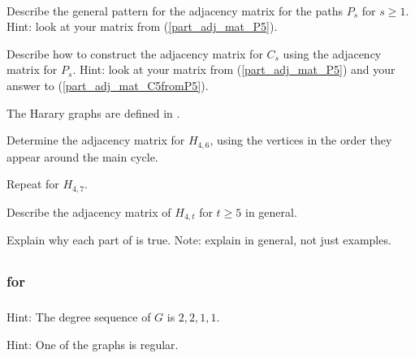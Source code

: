 \begin{exer}[\exerE] %
\label{exer_adj_mat_path_cycle} 
~
    \begin{exerpart}
        \item Describe the general pattern for the adjacency matrix for the paths $P_s$ for $s \ge 1$.  Hint: look at your matrix from  (\ref{part_adj_mat_P5}).
        \item Describe how to construct the adjacency matrix for $C_s$ using the adjacency matrix for $P_s$.  Hint: look at your matrix from  (\ref{part_adj_mat_P5}) and your answer to (\ref{part_adj_mat_C5fromP5}). %
        
    \end{exerpart}
\end{exer}

\begin{exer}[\exerE] %
\label{exer_adj_mat_harary} 
    The Harary graphs are defined in . %
        \begin{exerpart}
            \item Determine the adjacency matrix for $H_{4,6}$, using the vertices in the order they appear around the main cycle.
            \item Repeat for $H_{4,7}$.
            \item Describe the adjacency matrix of $H_{4,t}$ for $t \ge5$ in general.
        \end{exerpart} 
\end{exer}

\begin{exer}[\exerE] %
\label{exer_adj_mat_thm_explain}
  Explain why each part of  is true.  Note: explain in general, not just examples.
\end{exer}


\subsection{\answers}

\subsubsection{\answers for  \subdegseq}

\subsubsection*{ \answers}
\begin{apart}
    \item Hint: The degree sequence of $G$ is $2,2,1,1$.  
    \item Hint: One of the graphs is regular.
\end{apart}

